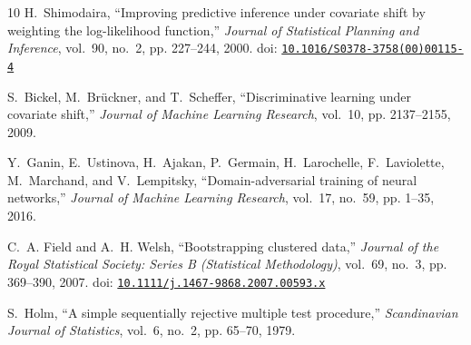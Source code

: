 \begin{thebibliography}{10}
H.~Shimodaira, ``Improving predictive inference under covariate shift by
  weighting the log-likelihood function,'' \emph{Journal of Statistical
  Planning and Inference}, vol.~90, no.~2, pp. 227--244, 2000. doi:
  \href{https://doi.org/10.1016/S0378-3758(00)00115-4}{\nolinkurl{10.1016/S0378-3758(00)00115-4}}

S.~Bickel, M.~Br{\"u}ckner, and T.~Scheffer, ``Discriminative learning under
  covariate shift,'' \emph{Journal of Machine Learning Research}, vol.~10,
  pp. 2137--2155, 2009.

Y.~Ganin, E.~Ustinova, H.~Ajakan, P.~Germain, H.~Larochelle, F.~Laviolette,
  M.~Marchand, and V.~Lempitsky, ``Domain-adversarial training of neural
  networks,'' \emph{Journal of Machine Learning Research}, vol.~17, no.~59,
  pp. 1--35, 2016.

C.~A. Field and A.~H. Welsh, ``Bootstrapping clustered data,'' \emph{Journal
  of the Royal Statistical Society: Series B (Statistical Methodology)},
  vol.~69, no.~3, pp. 369--390, 2007. doi:
  \href{https://doi.org/10.1111/j.1467-9868.2007.00593.x}{\nolinkurl{10.1111/j.1467-9868.2007.00593.x}}

S.~Holm, ``A simple sequentially rejective multiple test procedure,''
  \emph{Scandinavian Journal of Statistics}, vol.~6, no.~2, pp. 65--70, 1979.

\end{thebibliography}
